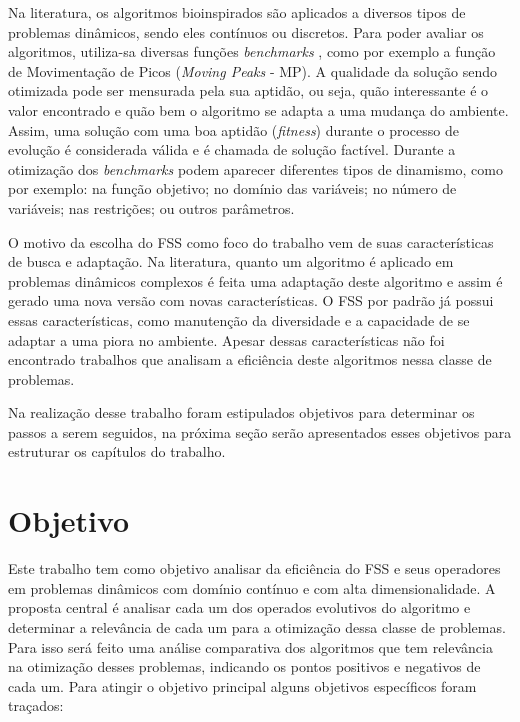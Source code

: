 Na literatura, os algoritmos bioinspirados são aplicados a diversos tipos de problemas dinâmicos, sendo eles contínuos ou discretos. Para poder avaliar os algoritmos, utiliza-sa diversas funções \textit{benchmarks} \cite{moser2007review}, como por exemplo a função de Movimentação de Picos (\textit{Moving Peaks} - MP). A qualidade da solução sendo otimizada pode ser mensurada pela sua aptidão, ou seja, quão interessante é o valor encontrado e quão bem o algoritmo se adapta a uma mudança do ambiente. Assim, uma solução com uma boa aptidão (\textit{fitness}) durante o processo de evolução é considerada válida e é chamada de solução factível. Durante a otimização dos \textit{benchmarks} podem aparecer diferentes tipos de dinamismo, como por exemplo: na função objetivo; no domínio das variáveis; no número de variáveis; nas restrições; ou outros parâmetros.

O motivo da escolha do FSS como foco do trabalho vem de suas características de busca e adaptação. Na literatura, quanto um algoritmo é aplicado em problemas dinâmicos complexos é feita uma adaptação deste algoritmo e assim é gerado uma nova versão com novas características. O FSS por padrão já possui essas características, como manutenção da diversidade e a capacidade de se adaptar a uma piora no ambiente. Apesar dessas características não foi encontrado trabalhos que analisam a eficiência deste algoritmos nessa classe de problemas. 

Na realização desse trabalho foram estipulados objetivos para determinar os passos a serem seguidos, na próxima seção serão apresentados esses objetivos para estruturar os capítulos do trabalho.	

\section{Objetivo}
\label{sec:objetivo}
Este trabalho tem como objetivo analisar da eficiência do FSS e seus operadores em problemas dinâmicos com domínio contínuo e com alta dimensionalidade. A proposta central é analisar cada um dos operados evolutivos do algoritmo e determinar a relevância de cada um para a otimização dessa classe de problemas. Para isso será feito uma análise comparativa dos algoritmos que tem relevância na otimização desses problemas, indicando os pontos positivos e negativos de cada um. Para atingir o objetivo principal alguns objetivos específicos foram traçados:

